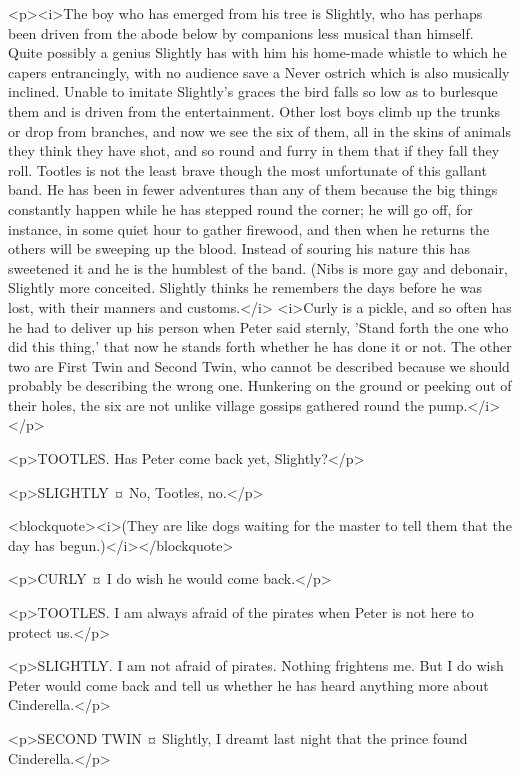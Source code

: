 <p><i>The boy who has emerged from his tree is Slightly, who has perhaps been driven from the abode below by companions less musical than himself. Quite possibly a genius Slightly has with him his home-made whistle to which he capers entrancingly, with no audience save a Never ostrich which is also musically inclined. Unable to imitate Slightly's graces the bird falls so low as to burlesque them and is driven from the entertainment. Other lost boys climb up the trunks or drop from branches, and now we see the six of them, all in the skins of animals they think they have shot, and so round and furry in them that if they fall they roll. Tootles is not the least brave though the most unfortunate of this gallant band. He has been in fewer adventures than any of them because the big things constantly happen while he has stepped round the corner; he will go off, for instance, in some quiet hour to gather firewood, and then when he returns the others will be sweeping up the blood. Instead of souring his nature this has sweetened it and he is the humblest of the band. (Nibs is more gay and debonair, Slightly more conceited. Slightly thinks he remembers the days before he was lost, with their manners and customs.</i> <i>Curly is a pickle, and so often has he had to deliver up his person when Peter said sternly, 'Stand forth the one who did this thing,' that now he stands forth whether he has done it or not. The other two are First Twin and Second Twin, who cannot be described because we should probably be describing the wrong one. Hunkering on the ground or peeking out of their holes, the six are not unlike village gossips gathered round the pump.</i></p>

<p>TOOTLES. Has Peter come back yet, Slightly?</p>

<p>SLIGHTLY ¤
No, Tootles, no.</p>

<blockquote><i>(They are like dogs waiting for the master to tell them that the day has begun.)</i></blockquote>

<p>CURLY ¤
I do wish he would come back.</p>

<p>TOOTLES. I am always afraid of the pirates when Peter is not here to protect us.</p>

<p>SLIGHTLY. I am not afraid of pirates. Nothing frightens me. But I do wish Peter would come back and tell us whether he has heard anything more about Cinderella.</p>

<p>SECOND TWIN ¤
Slightly, I dreamt last night that the prince found Cinderella.</p>

